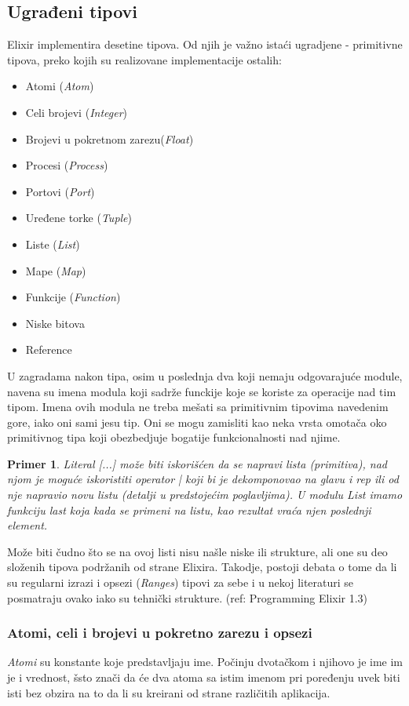 \documentclass[a4paper]{article}
\newtheorem{primer}{Primer}[section]
\begin{document}
\subsection{Ugrađeni tipovi}
\label{sec:tipovi}
Elixir implementira desetine tipova. Od njih je važno istaći ugradjene - primitivne tipova, preko kojih su realizovane implementacije ostalih:
\begin{itemize}
  \item Atomi (\textit{Atom})
  \item Celi brojevi (\textit{Integer})
  \item Brojevi u pokretnom zarezu(\textit{Float})
  \item Procesi (\textit{Process})
  \item Portovi (\textit{Port})
  \item Uređene torke (\textit{Tuple})
  \item Liste (\textit{List})
  \item Mape (\textit{Map})
  \item Funkcije (\textit{Function})
  \item Niske bitova 
  \item Reference
\end{itemize}

U zagradama nakon tipa, osim u poslednja dva koji nemaju odgovarajuće module, navena su imena modula koji sadrže funckije koje se koriste za operacije nad tim tipom. Imena ovih modula ne treba mešati sa primitivnim tipovima navedenim gore, iako oni sami jesu tip. Oni se mogu zamisliti kao neka vrsta omotača oko primitivnog tipa koji obezbedjuje bogatije funkcionalnosti nad njime. 
\begin{primer}
Literal [...] može biti iskorišćen da se napravi lista (primitiva), nad njom je moguće iskoristiti operator | koji bi je dekomponovao na glavu i rep ili od nje napravio novu listu (detalji u predstojećim poglavljima). U modulu \textit{List} imamo funkciju \textit{last} koja kada se primeni na listu, kao rezultat vraća njen poslednji element.
\end{primer}

Može biti čudno što se na ovoj listi nisu našle niske ili strukture, ali one su deo složenih tipova podržanih od strane Elixira. Takodje, postoji debata o tome da li su regularni izrazi i opsezi (\textit{Ranges}) tipovi za sebe i u nekoj literaturi se posmatraju ovako iako su tehnički strukture. (ref: Programming Elixir 1.3)

\subsubsection{Atomi, celi i brojevi u pokretno zarezu i opsezi}
\label{sec:ime}
\textit{Atomi} su konstante koje predstavljaju ime. Počinju dvotačkom i njihovo je ime im je i vrednost, šsto znači da će dva atoma sa istim imenom pri poređenju uvek biti isti bez obzira na to da li su kreirani od strane različitih aplikacija.
\end{document}
